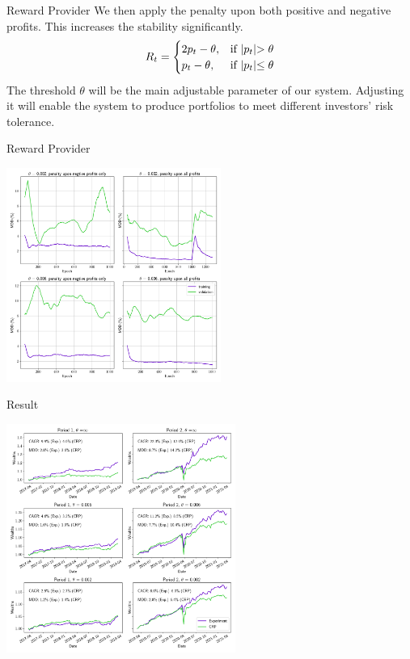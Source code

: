 \begin{frame}{Reward Provider}
We then apply the penalty upon both positive and negative profits. This increases the stability significantly.
\[
R_t = 
\begin{cases}
    2p_t - \theta,&\text{if  }    $$|p_t|$$ > \theta\\
    p_t - \theta ,&\text{if  } $$|p_t|$$\leq  \theta
\end{cases}
\]
The threshold \(\theta\) will be the main adjustable parameter of our system. Adjusting it will enable the system to produce portfolios to meet different investors' risk tolerance.
\end{frame}
\begin{frame}{Reward Provider}
\begin{center}
      \includegraphics[height=7cm]{images/penalty_negtive_profits_compare.png}
\end{center}
\end{frame}

\begin{frame}{Result}
\begin{center}
\includegraphics[height= 7.5cm]{images/crp_compare.png}
\end{center}
\end{frame}
